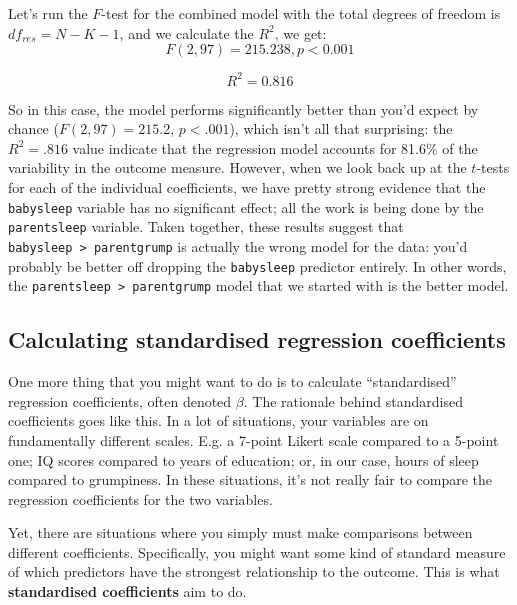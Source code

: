 \documentclass[
]{book}
\theoremstyle{definition}
\theoremstyle{definition}
\theoremstyle{definition}
\theoremstyle{definition}
\theoremstyle{remark}
\begin{document}
Let's run the \(F\)-test for the combined model with the total degrees of freedom is \(df_{res} = N - K - 1\), and we calculate the \(R^2\), we get:
\[
F(2, 97) = 215.238, p < 0.001
\]

\[
R^2 = 0.816
\]

So in this case, the model performs significantly better than you'd expect by chance (\(F(2,97) = 215.2\), \(p<.001\)), which isn't all that surprising: the \(R^2 = .816\) value indicate that the regression model accounts for 81.6\% of the variability in the outcome measure. However, when we look back up at the \(t\)-tests for each of the individual coefficients, we have pretty strong evidence that the \texttt{babysleep} variable has no significant effect; all the work is being done by the \texttt{parentsleep} variable. Taken together, these results suggest that \texttt{babysleep\ \textgreater{}\ parentgrump} is actually the wrong model for the data: you'd probably be better off dropping the \texttt{babysleep} predictor entirely. In other words, the \texttt{parentsleep\ \textgreater{}\ parentgrump} model that we started with is the better model.

\hypertarget{stdcoef}{%
\subsection{Calculating standardised regression coefficients}\label{stdcoef}}

One more thing that you might want to do is to calculate ``standardised'' regression coefficients, often denoted \(\beta\). The rationale behind standardised coefficients goes like this. In a lot of situations, your variables are on fundamentally different scales. E.g. a 7-point Likert scale compared to a 5-point one; IQ scores compared to years of education; or, in our case, hours of sleep compared to grumpiness. In these situations, it's not really fair to compare the regression coefficients for the two variables.

Yet, there are situations where you simply must make comparisons between different coefficients. Specifically, you might want some kind of standard measure of which predictors have the strongest relationship to the outcome. This is what \textbf{standardised coefficients} aim to do.
\end{document}

